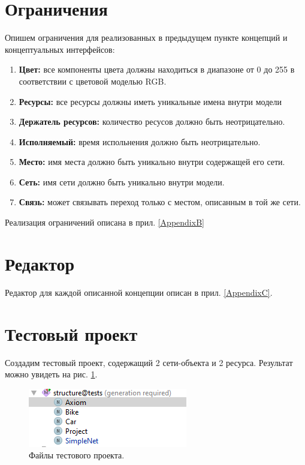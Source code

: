 	\section{Ограничения}
		Опишем ограничения для реализованных в предыдущем пункте концепций и концептуальных интерфейсов:
		\begin{enumerate}
			\item \textbf{Цвет:} все компоненты цвета должны находиться в диапазоне от 0 до 255 в соответствии с цветовой моделью RGB.
			\item \textbf{Ресурсы:} все ресурсы должны иметь уникальные имена внутри модели
			\item \textbf{Держатель ресурсов:} количество ресусов должно быть неотрицательно.
			\item \textbf{Исполняемый:} время испольнения должно быть неотрицательно.
			\item \textbf{Место:} имя места должно быть уникально внутри содержащей его сети.
			\item \textbf{Сеть:} имя сети должно быть уникально внутри модели.
			\item \textbf{Связь:} может связывать переход только с местом, описанным в той же сети.
		\end{enumerate}
			
		Реализация ограничений описана в прил. \ref{AppendixB}
		
	\section{Редактор}
		Редактор для каждой описанной концепции описан в прил. \ref{AppendixC}.
		
	\section{Тестовый проект}
		Создадим тестовый проект, содержащий 2 сети-объекта и 2 ресурса. Результат можно увидеть на рис. \ref{fig:project-tree}.	

		\begin{figure}[th]
			\centering
			\includegraphics[width=0.7\linewidth]{images/test-project/project-tree}
			\caption{Файлы тестового проекта.}
			\label{fig:project-tree}
		\end{figure}
	
